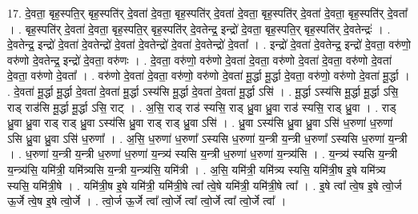 \documentclass[17pt]{extarticle}
\begin{document}
17. दे॒वता॒ बृह॒स्पति॒र् बृह॒स्पति॑र् दे॒वता॑ दे॒वता॒ बृह॒स्पति॑र् दे॒वता॑ दे॒वता॒ बृह॒स्पति॑र् दे॒वता॑ दे॒वता॒ बृह॒स्पति॑र् दे॒वता᳚ । . बृह॒स्पति॑र् दे॒वता॑ दे॒वता॒ बृह॒स्पति॒र् बृह॒स्पति॑र् दे॒वतेन्द्र॒ इन्द्रो॑ दे॒वता॒ बृह॒स्पति॒र् बृह॒स्पति॑र् दे॒वतेन्द्रः॑ । . दे॒वतेन्द्र॒ इन्द्रो॑ दे॒वता॑ दे॒वतेन्द्रो॑ दे॒वता॑ दे॒वतेन्द्रो॑ दे॒वता॑ दे॒वतेन्द्रो॑ दे॒वता᳚ । . इन्द्रो॑ दे॒वता॑ दे॒वतेन्द्र॒ इन्द्रो॑ दे॒वता॒ वरु॑णो॒ वरु॑णो दे॒वतेन्द्र॒ इन्द्रो॑ दे॒वता॒ वरु॑णः । . दे॒वता॒ वरु॑णो॒ वरु॑णो दे॒वता॑ दे॒वता॒ वरु॑णो दे॒वता॑ दे॒वता॒ वरु॑णो दे॒वता॑ दे॒वता॒ वरु॑णो दे॒वता᳚ । . वरु॑णो दे॒वता॑ दे॒वता॒ वरु॑णो॒ वरु॑णो दे॒वता॑ मू॒र्द्धा मू॒र्द्धा दे॒वता॒ वरु॑णो॒ वरु॑णो दे॒वता॑ मू॒र्द्धा । . दे॒वता॑ मू॒र्द्धा मू॒र्द्धा दे॒वता॑ दे॒वता॑ मू॒र्द्धा ऽस्य॑सि मू॒र्द्धा दे॒वता॑ दे॒वता॑ मू॒र्द्धा ऽसि॑ । . मू॒र्द्धा ऽस्य॑सि मू॒र्द्धा मू॒र्द्धा ऽसि॒ राड् राड॑सि मू॒र्द्धा मू॒र्द्धा ऽसि॒ राट् । . अ॒सि॒ राड् राड॑ स्यसि॒ राड् ध्रु॒वा ध्रु॒वा राड॑ स्यसि॒ राड् ध्रु॒वा । . राड् ध्रु॒वा ध्रु॒वा राड् राड् ध्रु॒वा ऽस्य॑सि ध्रु॒वा राड् राड् ध्रु॒वा ऽसि॑ । . ध्रु॒वा ऽस्य॑सि ध्रु॒वा ध्रु॒वा ऽसि॑ ध॒रुणा॑ ध॒रुणा॑ ऽसि ध्रु॒वा ध्रु॒वा ऽसि॑ ध॒रुणा᳚ । . अ॒सि॒ ध॒रुणा॑ ध॒रुणा᳚ ऽस्यसि ध॒रुणा॑ य॒न्त्री य॒न्त्री ध॒रुणा᳚ ऽस्यसि ध॒रुणा॑ य॒न्त्री । . ध॒रुणा॑ य॒न्त्री य॒न्त्री ध॒रुणा॑ ध॒रुणा॑ य॒न्त्र्य॑ स्यसि य॒न्त्री ध॒रुणा॑ ध॒रुणा॑ य॒न्त्र्य॑सि । . य॒न्त्र्य॑ स्यसि य॒न्त्री य॒न्त्र्य॑सि॒ यमि॑त्री॒ यमि॑त्र्यसि य॒न्त्री य॒न्त्र्य॑सि॒ यमि॑त्री । . अ॒सि॒ यमि॑त्री॒ यमि॑त्र्य स्यसि॒ यमि॑त्री॒ष इ॒षे यमि॑त्र्य स्यसि॒ यमि॑त्री॒षे । . यमि॑त्री॒ष इ॒षे यमि॑त्री॒ यमि॑त्री॒षे त्वा᳚ त्वे॒षे यमि॑त्री॒ यमि॑त्री॒षे त्वा᳚ । . इ॒षे त्वा᳚ त्वे॒ष इ॒षे त्वो॒र्ज ऊ॒र्जे त्वे॒ष इ॒षे त्वो॒र्जे । . त्वो॒र्ज ऊ॒र्जे त्वा᳚ त्वो॒र्जे त्वा᳚ त्वो॒र्जे त्वा᳚ त्वो॒र्जे त्वा᳚ । \newline
\end{document}
